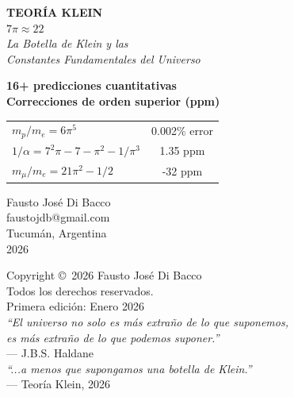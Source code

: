 \documentclass[12pt, a4paper, twoside]{book}
\begin{document}
\begin{titlepage}
    \centering
    \vspace*{2cm}

    {\Huge\bfseries TEORÍA KLEIN}\\[0.5cm]
    {\huge $7\pi \approx 22$}\\[1cm]

    {\Large\itshape La Botella de Klein y las\\Constantes Fundamentales del Universo}\\[2cm]

    \begin{tcolorbox}[colback=kleingray, colframe=kleinblue, width=0.8\textwidth]
    \centering
    \textbf{16+ predicciones cuantitativas}\\
    \textbf{Correcciones de orden superior (ppm)}\\[0.3cm]
    \begin{tabular}{lc}
    $m_p/m_e = 6\pi^5$ & 0.002\% error \\
    $1/\alpha = 7^2\pi - 7 - \pi^2 - 1/\pi^3$ & 1.35 ppm \\
    $m_\mu/m_e = 21\pi^2 - 1/2$ & -32 ppm \\
    \end{tabular}
    \end{tcolorbox}

    \vfill

    {\Large Fausto José Di Bacco}\\[0.3cm]
    {\large faustojdb@gmail.com}\\[1cm]

    {\large Tucumán, Argentina}\\
    {\large 2026}

\end{titlepage}

\thispagestyle{empty}
\vspace*{\fill}
\begin{center}
Copyright \copyright\ 2026 Fausto José Di Bacco\\
Todos los derechos reservados.\\[1cm]
Primera edición: Enero 2026\\[1cm]
\textit{``El universo no solo es más extraño de lo que suponemos,\\
es más extraño de lo que podemos suponer.''}\\
--- J.B.S. Haldane\\[0.5cm]
\textit{``...a menos que supongamos una botella de Klein.''}\\
--- Teoría Klein, 2026
\end{center}
\vspace*{\fill}
\newpage
\end{document}
